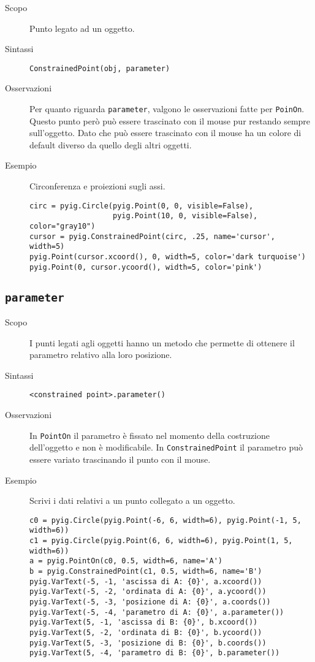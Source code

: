 \begin{description}
 \item [Scopo] Punto legato ad un oggetto.
 \item [Sintassi] \lstinline{ConstrainedPoint(obj, parameter)}
 \item [Osservazioni] Per quanto riguarda \lstinline{parameter}, valgono le 
osservazioni fatte per \lstinline{PoinOn}.
Questo punto però può essere trascinato con il mouse pur restando sempre
sull'oggetto. Dato che può essere trascinato con il mouse
ha un colore di default diverso da quello degli altri oggetti.

 \item [Esempio] Circonferenza e proiezioni sugli assi.

\begin{lstlisting}
circ = pyig.Circle(pyig.Point(0, 0, visible=False),
                   pyig.Point(10, 0, visible=False), color="gray10")
cursor = pyig.ConstrainedPoint(circ, .25, name='cursor', width=5)
pyig.Point(cursor.xcoord(), 0, width=5, color='dark turquoise')
pyig.Point(0, cursor.ycoord(), width=5, color='pink')
\end{lstlisting}

\end{description}

\subsection{\lstinline{parameter}}
\label{sub:geoint_parameter}

\begin{description}
 \item [Scopo] I punti legati agli oggetti hanno un metodo che permette di 
ottenere il parametro relativo alla loro posizione.

 \item [Sintassi] \lstinline{<constrained point>.parameter()}
 \item [Osservazioni]
In \lstinline{PointOn} il parametro è fissato nel momento della costruzione
dell'oggetto e non è modificabile. In \lstinline{ConstrainedPoint} il parametro 
può essere variato trascinando il punto con il mouse.

 \item [Esempio] Scrivi i dati relativi a un punto collegato a un oggetto.

\begin{lstlisting}
c0 = pyig.Circle(pyig.Point(-6, 6, width=6), pyig.Point(-1, 5, width=6))
c1 = pyig.Circle(pyig.Point(6, 6, width=6), pyig.Point(1, 5, width=6))
a = pyig.PointOn(c0, 0.5, width=6, name='A')
b = pyig.ConstrainedPoint(c1, 0.5, width=6, name='B')
pyig.VarText(-5, -1, 'ascissa di A: {0}', a.xcoord())
pyig.VarText(-5, -2, 'ordinata di A: {0}', a.ycoord())
pyig.VarText(-5, -3, 'posizione di A: {0}', a.coords())
pyig.VarText(-5, -4, 'parametro di A: {0}', a.parameter())
pyig.VarText(5, -1, 'ascissa di B: {0}', b.xcoord())
pyig.VarText(5, -2, 'ordinata di B: {0}', b.ycoord())
pyig.VarText(5, -3, 'posizione di B: {0}', b.coords())
pyig.VarText(5, -4, 'parametro di B: {0}', b.parameter())
\end{lstlisting}

\end{description}


